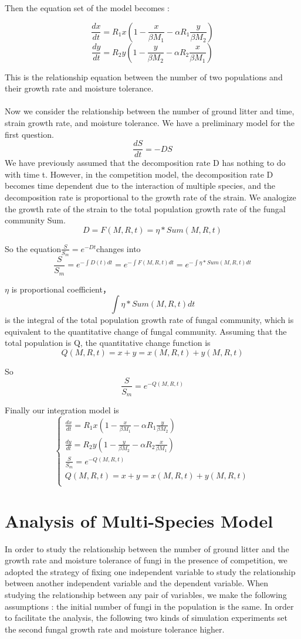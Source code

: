 \documentclass{mcmthesis}
\begin{document}
Then the equation set of the model becomes :

$$\frac{d x}{d t}=R_{1} x\left(1-\frac{x}{\beta M_{1}}-\alpha R_{1} \frac{y}{\beta M_{2}}\right)$$ 
$$\frac{d y}{d t}=R_{2} y\left(1-\frac{y}{\beta M_{2}}-\alpha R_{2} \frac{x}{\beta M_{1}}\right)$$

This is the relationship equation between the number of two populations and their growth rate and moisture tolerance.
\\
\\
Now we consider the relationship between the number of ground litter and time, strain growth rate, and moisture tolerance. We have a preliminary model for the first question.
$$\frac{d S}{d t}=-D S$$
We have previously assumed that the decomposition rate D has nothing to do with time t. However, in the competition model, the decomposition rate D becomes time dependent due to the interaction of multiple species, and the decomposition rate is proportional to the growth rate of the strain. We analogize the growth rate of the strain to the total population growth rate of the fungal community Sum.
$$D=F(M,R,t)=\eta * Sum(M,R,t)$$

So the equation$\frac{S}{S_m}=e^{-D t}$changes into$$\frac{S}{S_{m}}=e^{-\int D(t) d t}=e^{-\int F(M,R,t) d t}=e^{-\int \eta * Sum(M,R,t) d t}$$

$\eta$ is proportional coefficient，$$\int \eta * Sum(M,R,t) d t$$is the integral of the total population growth rate of fungal community, which is equivalent to the quantitative change of fungal community. Assuming that the total population is Q, the quantitative change function is$$Q(M,R,t)=x+y=x(M,R,t)+y(M,R,t)$$

So$$\frac{S}{S_m}=e^{-Q(M,R,t)}$$

Finally our integration model is
$$\left\{
\begin{array}{l}
	\frac{d x}{d t}=R_{1} x\left(1-\frac{x}{\beta M_{1}}-\alpha R_{1} \frac{y}{\beta M_{2}}\right)\\
	\frac{d y}{d t}=R_{2} y\left(1-\frac{y}{\beta M_{2}}-\alpha R_{2} \frac{x}{\beta M_{1}}\right)\\
	\frac{S}{S_m}=e^{-Q(M,R,t)}\\
	Q(M,R,t)=x+y=x(M,R,t)+y(M,R,t)\\
\end{array}
\right.
$$
\section{Analysis of Multi-Species Model}
In order to study the relationship between the number of ground litter and the growth rate and moisture tolerance of fungi in the presence of competition, we adopted the strategy of fixing one independent variable to study the relationship between another independent variable and the dependent variable.   When studying the relationship between any pair of variables, we make the following assumptions : the initial number of fungi in the population is the same. In order to facilitate the analysis, the following two kinds of simulation experiments set the second fungal growth rate and moisture tolerance higher.
\end{document}
